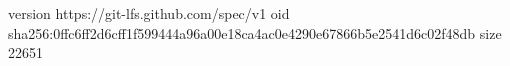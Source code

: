 version https://git-lfs.github.com/spec/v1
oid sha256:0ffc6ff2d6cff1f599444a96a00e18ca4ac0e4290e67866b5e2541d6c02f48db
size 22651
